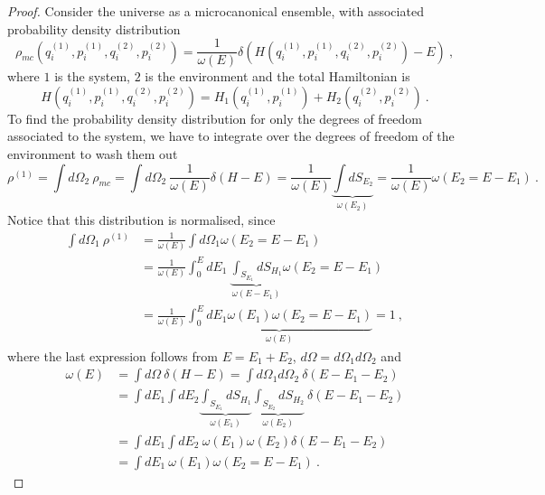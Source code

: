     \begin{proof}
        Consider the universe as a microcanonical ensemble, with associated probability density distribution 
        \begin{equation*}
            \rho_{mc} (q_i^{(1)}, p_i^{(1)}, q_i^{(2)}, p_i^{(2)}) = \frac{1}{\omega(E)} \delta (H (q_i^{(1)}, p_i^{(1)}, q_i^{(2)}, p_i^{(2)}) - E) ~,
        \end{equation*}
        where $1$ is the system, $2$ is the environment and the total Hamiltonian is 
        \begin{equation*}
            H (q_i^{(1)}, p_i^{(1)}, q_i^{(2)}, p_i^{(2)}) = H_1 (q_i^{(1)}, p_i^{(1)}) + H_2 (q_i^{(2)}, p_i^{(2)}) ~.
        \end{equation*}
        To find the probability density distribution for only the degrees of freedom associated to the system, we have to integrate over the degrees of freedom of the environment to wash them out
        \begin{equation*}
            \rho^{(1)} = \int d\Omega_2 ~ \rho_{mc} = \int d\Omega_2 ~ \frac{1}{\omega(E)} \delta(H - E) = \frac{1}{\omega(E)} \underbrace{\int dS_{E_2}}_{\omega(E_2)} = \frac{1}{\omega(E)} \omega(E_2 = E - E_1) ~.
        \end{equation*}
        Notice that this distribution is normalised, since 
        \begin{equation*}
        \begin{aligned}
            \int d\Omega_1 ~ \rho^{(1)} & = \frac{1}{\omega(E)} \int d\Omega_1 \omega(E_2 = E - E_1) \\ & = \frac{1}{\omega(E)} \int_0^E dE_1 ~ \underbrace{\int_{S_{E_1}} dS_{H_1}}_{\omega(E-E_1)} \omega(E_2 = E - E_1) \\ & = \frac{1}{\omega(E)} \underbrace{\int_0^E dE_1 \omega(E_1) \omega(E_2 = E - E_1) }_{\omega(E)} = 1 ~,
        \end{aligned}
        \end{equation*}
        where the last expression follows from $E = E_1 + E_2$, $d\Omega = d\Omega_1 d\Omega_2$ and 
        \begin{equation*}
        \begin{aligned}
            \omega(E) & = \int d\Omega ~ \delta(H - E) = \int d\Omega_1 d\Omega_2 ~ \delta(E - E_1 - E_2) \\ & = \int dE_1 \int dE_2 \underbrace{\int_{S_{E_1}} dS_{H_1}}_{\omega(E_1)} \underbrace{\int_{S_{E_2}} dS_{H_2}}_{\omega(E_2)} ~ \delta(E - E_1 - E_2) \\ & = \int dE_1 \int dE_2 ~\omega(E_1) \omega(E_2) \delta(E - E_1 - E_2)\\ &  = \int dE_1 ~ \omega(E_1) \omega(E_2 = E - E_1) ~.

\end{aligned}
\end{equation*}
\end{proof}
